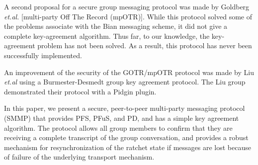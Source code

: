 \documentclass[%
preprint,
amsmath,amssymb,
aps,
prb,
floatfix,
]{revtex4-1}
\begin{document}
A second proposal for a secure group messaging protocol was made by Goldberg
\textit{et.al.}\cite{ref:goldberg} [multi-party Off The Record (mpOTR)].
While this protocol solved some of the
problems associate with the Bian messaging scheme, it did not give a complete
key-agreement algorithm. Thus far, to our knowledge, the key-agreement problem
has not been solved. As a result, this protocol has never been successfully
implemented.

An improvement of the security of the GOTR/mpOTR protocol was made by Liu
\textit{et.al}\cite{ref:liu} using a Burmester-Desmedt\cite{ref:burmester}
group key agreement
protocol. The Liu group demonstrated their protocol with a
Pidgin\cite{ref:pidgin} plugin.

In this paper, we present a secure, peer-to-peer multi-party messaging protocol
(SMMP) that provides PFS, PFuS, and PD, and has a simple key agreement
algorithm. The protocol allows all group members to confirm that they are
receiving a complete transcript of the group conversation, and provides a
robust mechanism for resynchronization of the ratchet state if messages are lost
because of failure of the underlying transport mechanism.
\end{document}
